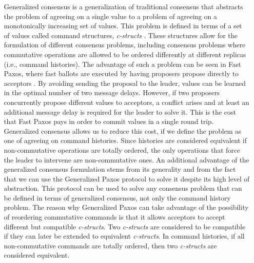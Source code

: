 Generalized consensus is a generalization of traditional consensus that abstracts the problem of agreeing on a single value to a problem of agreeing on a monotonically increasing set of values. This problem is defined in terms of a set of values called command structures, \textit{c-structs} \cite{Lamport2005}. These structures allow for the formulation of different consensus problems, including consensus problems where commutative operations are allowed to be ordered differently at different replicas (i.e., command histories). The advantage of such a problem can be seen in Fast Paxos, where fast ballots are executed by having proposers propose directly to acceptors \cite{Lamport2006}. By avoiding sending the proposal to the leader, values can be learned in the optimal number of two message delays. However, if two proposers concurrently propose different values to acceptors, a conflict arises and at least an additional message delay is required for the leader to solve it. This is the cost that Fast Paxos pays in order to commit values in a single round trip.  Generalized consensus allows us to reduce this cost, if we define the problem as one of agreeing on command histories. Since histories are considered equivalent if non-commutative operations are totally ordered, the only operations that force the leader to intervene are non-commutative ones. An additional advantage of the generalized consensus formulation stems from its generality and from the fact that we can use the Generalized Paxos protocol to solve it despite its high level of abstraction. This protocol can be used to solve any consensus problem that can be defined in terms of generalized consensus, not only the command history problem. The reason why Generalized Paxos can take advantage of the possibility of reordering commutative commands is that it allows acceptors to accept different but compatible \textit{c-structs}. Two \textit{c-structs} are considered to be compatible if they can later be extended to equivalent \textit{c-structs}. In command histories, if all non-commutative commands are totally ordered, then two \textit{c-structs} are considered equivalent. \par
